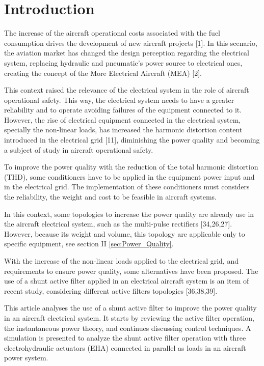\section{Introduction}

The increase of the aircraft operational costs associated with the fuel consumption drives the development of new aircraft projects \cite{Babikian2002} [1]. In this scenario, the aviation market has changed the design perception regarding the electrical system, replacing hydraulic and pneumatic’s power source to electrical ones, creating the concept of the More Electrical Aircraft (MEA) \cite{Moir1999} [2].

This context raised the relevance of the electrical system in the role of aircraft operational safety. This way, the electrical system needs to have a greater reliability and to operate avoiding failures of the equipment connected to it. However, the rise of electrical equipment connected in the electrical system, specially the non-linear loads, has increased the harmonic distortion content introduced in the electrical grid \cite{Singer2012} [11], diminishing the power quality and becoming a subject of study in aircraft operational safety. 

To improve the power quality with the reduction of the total harmonic distortion (THD), some conditioners have to be applied in the equipment power input and in the electrical grid. The implementation of these conditioners must considers the reliability, the weight and cost to be feasible in aircraft systems.

In this context, some topologies to increase the power quality are already use in the aircraft electrical system, such as the multi-pulse rectifiers \cite{Zhu2014,Gong2003,Lobo2005} [34,26,27]. However, because its weight and volume, this topology are applicable only to specific equipment, see section II \ref{sec:Power_Quality}.

With the increase of the non-linear loads applied to the electrical grid, and requirements to ensure power quality, some alternatives have been proposed. The use of a shunt active filter applied in an electrical aircraft system is an item of recent study, considering different active filters topologies \cite{Chen2012research,Chen2012novel,Chen2012control} [36,38,39].

This article analyses the use of a shunt active filter to improve the power quality in an aircraft electrical system. It starts by reviewing the active filter operation, the instantaneous power theory, and continues discussing control techniques. A simulation is presented to analyze the shunt active filter operation with three electrohydraulic actuators (EHA) connected in parallel as loads in an aircraft power system.


